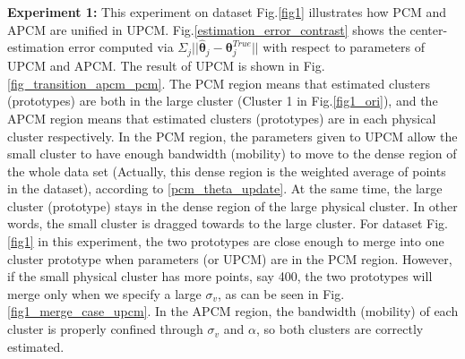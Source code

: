 \documentclass[journal,transmag]{IEEEtran}
\theoremstyle{definition}
\begin{document}
\textbf{Experiment 1:} This experiment on dataset Fig.\ref{fig1} illustrates how PCM and APCM are unified in UPCM.
Fig.\ref{estimation_error_contrast} shows the center-estimation error computed via $\Sigma_j||\hat{\boldsymbol{\theta}}_j-\boldsymbol{\theta}_j^{True}||$ with respect to parameters of UPCM and APCM.
The result of UPCM is shown in Fig.\ref{fig_transition_apcm_pcm}. The PCM region means that estimated clusters (prototypes) are both in the large cluster (Cluster 1 in Fig.\ref{fig1_ori}), and the APCM region means that estimated clusters (prototypes) are in each physical cluster respectively.
In the PCM region, the parameters given to UPCM allow the small cluster to have enough bandwidth (mobility) to move to the dense region of the whole data set (Actually, this dense region is the weighted average of points in the dataset), according to \eqref{pcm_theta_update}. At the same time, the large cluster (prototype) stays in the dense region of the large physical cluster. In other words, the small cluster is dragged towards to the large cluster. For dataset Fig.\ref{fig1} in this experiment, the two prototypes are close enough to merge into one cluster prototype when parameters (or UPCM) are in the PCM region. However, if the small physical cluster has more points, say 400, the two prototypes will merge only when we specify a large $\sigma_v$, as can be seen in Fig.\ref{fig1_merge_case_upcm}.
In the APCM region, the bandwidth (mobility) of each cluster is properly confined through $\sigma_v$ and $\alpha$, so both clusters are correctly estimated.
\end{document}
